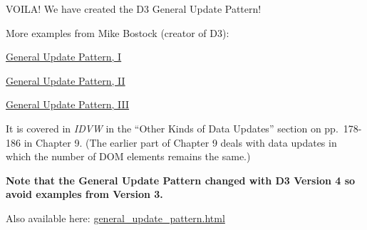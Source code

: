 \documentclass[openany]{book}
\begin{document}
VOILA! We have created the D3 General Update Pattern!

More examples from Mike Bostock (creator of D3):

\href{https://bl.ocks.org/mbostock/3808218}{General Update Pattern, I}

\href{https://bl.ocks.org/mbostock/3808221}{General Update Pattern, II}

\href{https://bl.ocks.org/mbostock/3808234}{General Update Pattern, III}

It is covered in \emph{IDVW} in the ``Other Kinds of Data Updates'' section on pp.~178-186 in Chapter 9. (The earlier part of Chapter 9 deals with data updates in which the number of DOM elements remains the same.)

\textbf{Note that the General Update Pattern changed with D3 Version 4 so avoid examples from Version 3.}

Also available here: \href{code/general_update_pattern.html}{general\_update\_pattern.html}
\end{document}

